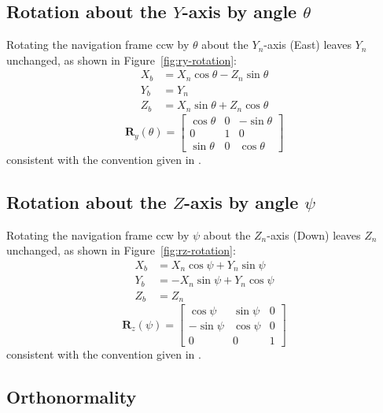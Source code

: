 \documentclass[12pt,a4paper]{article}
\begin{document}
{\subsection{Rotation about the \texorpdfstring{$Y$}{Y}-axis by angle \texorpdfstring{$\theta$}{theta}}
Rotating the navigation frame ccw by $\theta$ about the $Y_n$-axis (East)
leaves $Y_n$ unchanged, as shown in Figure~\ref{fig:ry-rotation}:
\begin{align*}
  X_b &= X_n\cos\theta - Z_n\sin\theta \\
  Y_b &= Y_n \\
  Z_b &= X_n\sin\theta + Z_n\cos\theta
\end{align*}
\begin{equation}
  \bm{R}_y(\theta) =
  \begin{bmatrix}
    \cos\theta & 0 & -\sin\theta \\
    0 & 1 & 0 \\
    \sin\theta & 0 & \cos\theta
  \end{bmatrix}
  \label{eq:Ry-appendix}
\end{equation}
consistent with the convention given in \citep{groves2013principles}.

\subsection{Rotation about the \texorpdfstring{$Z$}{Z}-axis by angle \texorpdfstring{$\psi$}{psi}}
Rotating the navigation frame ccw by $\psi$ about the $Z_n$-axis (Down)
leaves $Z_n$ unchanged, as shown in Figure~\ref{fig:rz-rotation}:
\begin{align*}
  X_b &= X_n\cos\psi + Y_n\sin\psi \\
  Y_b &= -X_n\sin\psi + Y_n\cos\psi \\
  Z_b &= Z_n
\end{align*}
\begin{equation}
  \bm{R}_z(\psi) =
  \begin{bmatrix}
    \cos\psi & \sin\psi & 0 \\
    - \sin\psi &  \cos\psi & 0 \\
    0 & 0 & 1
  \end{bmatrix}
  \label{eq:Rz-appendix}
\end{equation}
consistent with the convention given in \citep{groves2013principles}.

\subsection{Orthonormality}

}
\end{document}
